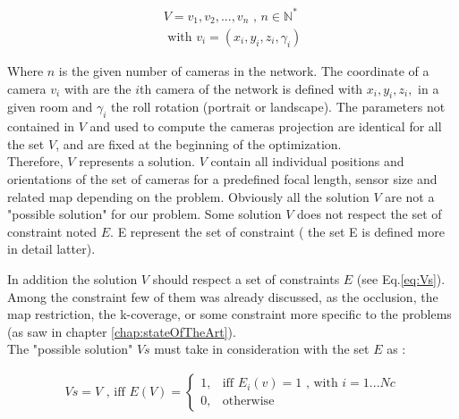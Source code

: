 \begin{equation}\label{eq:V}
		\begin{split}
			V= {v_1,v_2,...,v_n} \mbox{  , } n\in \mathbb{N}^*
				\\
			\mbox{ with } v_i= (x_i,y_i,z_i,\gamma_i)
		\end{split}
	\end{equation}
	
\noindent Where $n$ is the given number of cameras in the network. The coordinate of a camera $v_i$ with are the $i$th camera of the network is defined  with $x_i, y_i, z_i,$ in a given room and $\gamma_i$ the roll rotation (portrait or landscape). The parameters not contained in $V$ and used to compute the cameras projection are  identical for all the set $V$, and are fixed at the beginning of the optimization.\\
Therefore, $V$ represents a solution. $V$ contain all individual positions and orientations of the set of cameras for a predefined focal length, sensor size and related map depending on the problem.%
 Obviously all the solution $V$ are not a "possible solution" for our problem. Some solution $V$ does not respect the set of constraint noted $E$. E represent the set of constraint ( the set E is defined  more in detail latter). 

In addition the solution $V$ should respect a set of constraints  $E$ (see Eq.\ref{eq:Vs}). Among the constraint few of them was already discussed, as the occlusion, the map restriction, the k-coverage, or some constraint more specific to the problems (as saw in chapter \ref{chap:stateOfTheArt}).\\
 The "possible solution" $Vs$ must take in consideration with the set $E$ as :

 \begin{align}\label{eq:Vs}
Vs=V \mbox{ , iff } E(V)= \begin{cases} 1, & \mbox{iff } E_i(v)=1 \mbox{ , with } i=1...Nc \\ 0, & \mbox{otherwise}  \end{cases}
\end{align}

